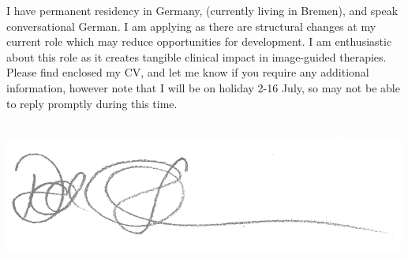 \documentclass[11pt, a4paper, sans]{moderncv}
\makeatletter
\renewcommand*{\makeletterclosing}{
  \@closing\\%
  \includegraphics[scale=0.7]{sinden-signature.pdf}\\
  {\@firstname~\@lastname}%
  \ifthenelse{\isundefined{\@enclosure}}{}{%
    \\[0.5\baselineskip]%
    {\color{color2}\itshape\enclname: \@enclosure}}%
    \vfil}
\makeatother
\begin{document}
\vfill
I have permanent residency in Germany, (currently living in Bremen), and speak conversational German. I am applying as there are structural changes at my current role which may reduce opportunities for development. I am enthusiastic about this role as it creates tangible clinical impact in image-guided therapies.  Please find enclosed my CV, and let me know if you require any additional information, however note that I will be on holiday 2-16 July, so may not be able to reply promptly during this time.  %
\vfill
\makeletterclosing
\vfill
\end{document}
